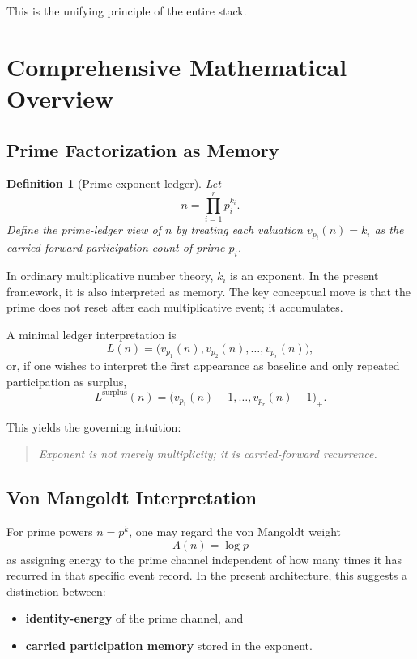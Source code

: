 \documentclass[11pt]{article}
\newtheorem{definition}{Definition}
\begin{document}
This is the unifying principle of the entire stack.

\section{Comprehensive Mathematical Overview}

\subsection{Prime Factorization as Memory}

\begin{definition}[Prime exponent ledger]
Let
\[
n=\prod_{i=1}^{r} p_i^{k_i}.
\]
Define the prime-ledger view of \(n\) by treating each valuation \(v_{p_i}(n)=k_i\) as the carried-forward participation count of prime \(p_i\).
\end{definition}

In ordinary multiplicative number theory, \(k_i\) is an exponent. In the present framework, it is also interpreted as memory. The key conceptual move is that the prime does not reset after each multiplicative event; it accumulates.

A minimal ledger interpretation is
\[
L(n) = \bigl(v_{p_1}(n),v_{p_2}(n),\dots,v_{p_r}(n)\bigr),
\]
or, if one wishes to interpret the first appearance as baseline and only repeated participation as surplus,
\[
L^{\mathrm{surplus}}(n) = \bigl(v_{p_1}(n)-1,\dots,v_{p_r}(n)-1\bigr)_+.
\]

This yields the governing intuition:

\begin{quote}
\emph{Exponent is not merely multiplicity; it is carried-forward recurrence.}
\end{quote}

\subsection{Von Mangoldt Interpretation}

For prime powers \(n=p^k\), one may regard the von Mangoldt weight
\[
\Lambda(n)=\log p
\]
as assigning energy to the prime channel independent of how many times it has recurred in that specific event record. In the present architecture, this suggests a distinction between:
\begin{itemize}[leftmargin=2em]
  \item \textbf{identity-energy} of the prime channel, and
  \item \textbf{carried participation memory} stored in the exponent.
\end{itemize}
\end{document}
